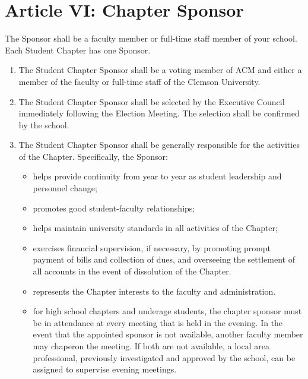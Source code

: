 \section*{Article VI: Chapter Sponsor}

The Sponsor shall be a faculty member or full-time staff member of your school. Each Student Chapter has one Sponsor.

\begin{enumerate}
    \item The Student Chapter Sponsor shall be a voting member of ACM and either a member of the faculty or full-time staff of the Clemson University.
    \item The Student Chapter Sponsor shall be selected by the Executive Council immediately following the Election Meeting. The selection shall be confirmed by the school.
    \item The Student Chapter Sponsor shall be generally responsible for the activities of the Chapter. Specifically, the Sponsor:
    \begin{itemize}
        \item helps provide continuity from year to year as student leadership and personnel change;
        \item promotes good student-faculty relationships;
        \item helps maintain university standards in all activities of the Chapter;
        \item exercises financial supervision, if necessary, by promoting prompt payment of bills and collection of dues, and overseeing the settlement of all accounts in the event of dissolution of the Chapter.
        \item represents the Chapter interests to the faculty and administration.
        \item for high school chapters and underage students, the chapter sponsor must be in attendance at every meeting that is held in the evening.
        In the event that the appointed sponsor is not available, another faculty member may chaperon the meeting.
        If both are not available, a local area professional, previously investigated and approved by the school, can be assigned to supervise evening meetings.
    \end{itemize}
\end{enumerate}
